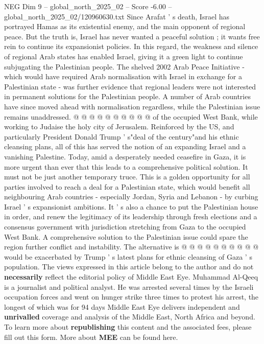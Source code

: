 \begin{textsample}{NEG Dim 9 – global\_north\_2025\_02 – Score -6.00 – global\_north\_2025\_02/120960630.txt}
Since Arafat ' s death, Israel has portrayed Hamas as its existential enemy, and the main opponent of regional peace.
But the truth is, Israel has never wanted a peaceful solution ; it wants free rein to continue its expansionist policies.
In this regard, the weakness and silence of regional Arab states has enabled Israel, giving it a green light to continue subjugating the Palestinian people.
The shelved 2002 Arab Peace Initiative - which would have required Arab normalisation with Israel in exchange for a Palestinian state - was further evidence that regional leaders were not interested in permanent solutions for the Palestinian people.
A number of Arab countries have since moved ahead with normalisation regardless, while the Palestinian issue remains unaddressed. @ @ @ @ @ @ @ @ @ @ of the occupied West Bank, while working to Judaise the holy city of Jerusalem.
Reinforced by the US, and particularly President Donald Trump ' s"deal of the century"and his ethnic cleansing plans, all of this has served the notion of an expanding Israel and a vanishing Palestine.
Today, amid a desperately needed ceasefire in Gaza, it is more urgent than ever that this leads to a comprehensive political solution.
It must not be just another temporary truce.
This is a golden opportunity for all parties involved to reach a deal for a Palestinian state, which would benefit all neighbouring Arab countries - especially Jordan, Syria and Lebanon - by curbing Israel ' s expansionist ambitions.
It ' s also a chance to put the Palestinian house in order, and renew the legitimacy of its leadership through fresh elections and a consensus government with jurisdiction stretching from Gaza to the occupied West Bank.
A comprehensive solution to the Palestinian issue could spare the region further conflict and instability.
The alternative is @ @ @ @ @ @ @ @ @ @ would be exacerbated by Trump ' s latest plans for ethnic cleansing of Gaza ' s population.
The views expressed in this article belong to the author and do not \textbf{necessarily} reflect the editorial policy of Middle East Eye.
Muhammad Al-Qeeq is a journalist and political analyst.
He was arrested several times by the Israeli occupation forces and went on hunger strike three times to protest his arrest, the longest of which was for 94 days Middle East Eye delivers independent and \textbf{unrivalled} coverage and analysis of the Middle East, North Africa and beyond.
To learn more about \textbf{republishing} this content and the associated fees, please fill out this form.
More about \textbf{MEE} can be found here.

\end{textsample}
